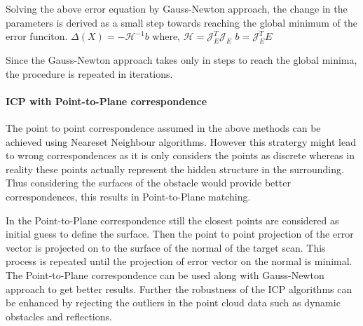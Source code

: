 Solving the above error equation by Gauss-Newton approach, the change in the parameters is derived as a small step towards reaching the global minimum of the error funciton.
    $\Delta(X) = -\mathcal{H}^{-1} b$
    where,
    $\mathcal{H} = \mathcal{J}_E^{T}\mathcal{J}_E$
    $b = \mathcal{J}_E^{T} E$

Since the Gauss-Newton approach takes only in steps to reach the global minima, the procedure is repeated in iterations.
\par
\paragraph{ICP with Point-to-Plane correspondence}
The point to point correspondence assumed in the above methods can be achieved using Neareset Neighbour algorithms. However this stratergy might lead to wrong correspondences as it is only considers the points as discrete
whereas in reality these points actually represent the hidden structure in the surrounding. Thus considering the surfaces of the obstacle would provide better correspondences, this results in Point-to-Plane matching.
\par
In the Point-to-Plane correspondence still the closest points are considered as initial guess to define the surface. Then the point to point projection of the error vector is projected on to the surface of the normal of the 
target scan. This process is repeated until the projection of error vector on the normal is minimal.
The Point-to-Plane correspondence can be used along with Gauss-Newton approach to get better results.
Further the robustness of the ICP algorithms can be enhanced by rejecting the outliers in the point cloud data such as dynamic obstacles and reflections.

